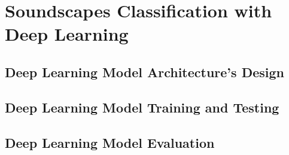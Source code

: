 




\chapter{Soundscapes Classification with Deep Learning}
\label{chap:model}

\section{Deep Learning Model Architecture’s Design}
\label{sec:model-arch}


\section{Deep Learning Model Training and Testing}
\label{sec:model-train}

\section{Deep Learning Model Evaluation}
\label{sec:model-eval}